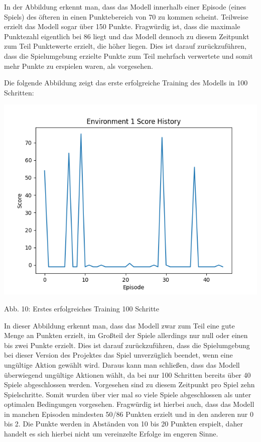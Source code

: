 In der Abbildung erkennt man, dass das Modell innerhalb einer Episode (eines Spiels) des öfteren in einen Punktebereich von 70 zu kommen scheint. Teilweise erzielt das Modell sogar über 150 Punkte. Fragwürdig ist, dass die maximale Punktezahl eigentlich bei 86 liegt und das Modell dennoch zu diesem Zeitpunkt zum Teil Punktewerte erzielt, die höher liegen. Dies ist darauf zurückzuführen, dass die Spielumgebung erzielte Punkte zum Teil mehrfach verwertete und somit mehr Punkte zu erspielen waren, als vorgesehen.

\begin{minipage}{\linewidth}
	Die folgende Abbildung zeigt das erste erfolgreiche Training des Modells in 100 Schritten:
	
	\vspace{0.5cm}
	\includegraphics[width=1\textwidth]{Bilder/firstpropertraining100steps}
	
	Abb. 10: Erstes erfolgreiches Training 100 Schritte\\
\end{minipage}

In dieser Abbildung erkennt man, dass das Modell zwar zum Teil eine gute Menge an Punkten erzielt, im Großteil der Spiele allerdings nur null oder einen bis zwei Punkte erzielt. Dies ist darauf zurückzuführen, dass die Spielumgebung bei dieser Version des Projektes das Spiel unverzüglich beendet, wenn eine ungültige Aktion gewählt wird. Daraus kann man schließen, dass das Modell überwiegend ungültige Aktionen wählt, da bei nur 100 Schritten bereits über 40 Spiele abgeschlossen werden. Vorgesehen sind zu diesem Zeitpunkt pro Spiel zehn Spielschritte. Somit wurden über vier mal so viele Spiele abgeschlossen als unter optimalen Bedingungen vorgesehen. Fragwürdig ist hierbei auch, dass das Modell in manchen Episoden mindesten 50/86 Punkten erzielt und in den anderen nur 0 bis 2. Die Punkte werden in Abständen von 10 bis 20 Punkten erspielt, daher handelt es sich hierbei nicht um vereinzelte Erfolge im engeren Sinne.
